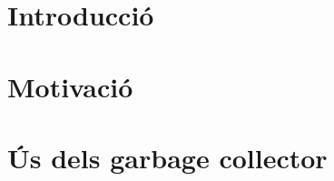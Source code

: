 \documentclass{report}
\begin{document}
 


\tableofcontents
\newpage


\section{Introducció}


\section{Motivació}


\section{Ús dels garbage collector}










\printbibliography[heading=bibintoc]
\end{document}
